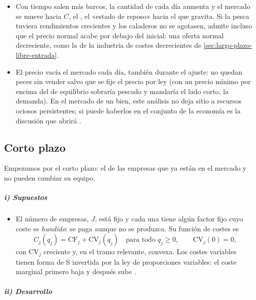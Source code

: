 \documentclass[11pt]{article}
\begin{document}
\begin{anotaciones}
\begin{itemize}
\item Con tiempo salen más barcos, la cantidad de cada día aumenta y el mercado se mueve hacia $C$, el , el «estado de reposo» hacia el que gravita. Si la pesca tuviera rendimientos crecientes y los caladeros no se agotasen,  admite incluso que el precio normal acabe por debajo del inicial: una oferta normal decreciente, como la de la industria de costes decrecientes de \ref{sec:largo-plazo-libre-entrada}\nocite{Marshall1890Principles}.
\item El precio vacía el mercado cada día, también durante el ajuste: no quedan peces sin vender salvo que se fije el precio por ley (con un precio mínimo por encima del de equilibrio sobraría pescado y mandaría el lado corto, la demanda). En el mercado de un bien, este análisis no deja sitio a recursos ociosos persistentes; si puede haberlos en el conjunto de la economía es la discusión que abrirá  .
\end{itemize}
\end{anotaciones}

\subsection{Corto plazo}\label{sec:corto-plazo}

Empezamos por el corto plazo: el de las empresas que ya están en el mercado y no pueden cambiar su equipo.

\subparagraph{i) Supuestos}

\begin{itemize}
\item El número de empresas, $J$, está fijo y cada una tiene algún factor fijo cuyo coste es \emph{hundido}: se paga aunque no se produzca. Su función de costes es
  \begin{equation}
  C_j(q_j)=\mathrm{CF}_j+\mathrm{CV}_j(q_j)\quad\text{para todo }q_j\geq 0,\qquad \mathrm{CV}_j(0)=0, \label{eq:costes-corto}
  \end{equation}
  con $\mathrm{CV}_j$ creciente y, en el tramo relevante, convexa\nocite{MasColellWhinstonGreen1995}. Los costes variables tienen forma de S invertida por la ley de proporciones variables: el coste marginal primero baja y después sube  .
\end{itemize}

\subparagraph{ii) Desarrollo}
\end{document}
